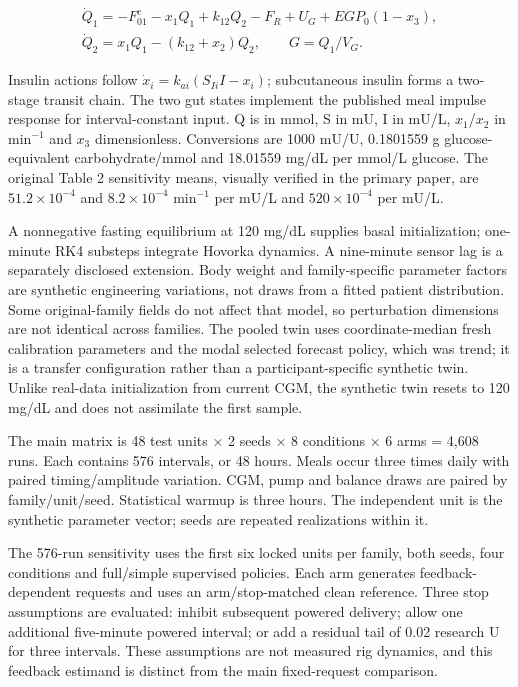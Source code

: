 \documentclass[journal,10pt,letterpaper]{IEEEtran}
\begin{document}
\[\begin{gathered}\dot Q_1=-F_{01}^c-x_1Q_1+k_{12}Q_2-F_R+U_G+EGP_0(1-x_3),\\
\dot Q_2=x_1Q_1-(k_{12}+x_2)Q_2,\qquad G=Q_1/V_G. 
\end{gathered}\tag{6}\]

Insulin actions follow \(\dot x_i=k_{ai}(S_{Ii}I-x_i)\); subcutaneous
insulin forms a two-stage transit chain. The two gut states implement
the published meal impulse response for interval-constant input. Q is in
mmol, S in mU, I in mU/L, \(x_1\)/\(x_2\) in \(\mathrm{min}^{-1}\) and
\(x_3\) dimensionless. Conversions are 1000 mU/U, 0.1801559 g
glucose-equivalent carbohydrate/mmol and 18.01559 mg/dL per mmol/L
glucose. The original Table 2 sensitivity means, visually verified in
the primary paper, are \(51.2\times10^{-4}\) and \(8.2\times10^{-4}\)
\(\mathrm{min}^{-1}\) per mU/L and \(520\times10^{-4}\) per mU/L.

A nonnegative fasting equilibrium at 120 mg/dL supplies basal
initialization; one-minute RK4 substeps integrate Hovorka dynamics. A
nine-minute sensor lag is a separately disclosed extension. Body weight
and family-specific parameter factors are synthetic engineering
variations, not draws from a fitted patient distribution. Some
original-family fields do not affect that model, so perturbation
dimensions are not identical across families. The pooled twin uses
coordinate-median fresh calibration parameters and the modal selected
forecast policy, which was trend; it is a transfer configuration rather
than a participant-specific synthetic twin. Unlike real-data
initialization from current CGM, the synthetic twin resets to 120 mg/dL
and does not assimilate the first sample.

The main matrix is 48 test units × 2 seeds × 8 conditions × 6 arms =
4,608 runs. Each contains 576 intervals, or 48 hours. Meals occur three
times daily with paired timing/amplitude variation. CGM, pump and
balance draws are paired by family/unit/seed. Statistical warmup is
three hours. The independent unit is the synthetic parameter vector;
seeds are repeated realizations within it.

The 576-run sensitivity uses the first six locked units per family, both
seeds, four conditions and full/simple supervised policies. Each arm
generates feedback-dependent requests and uses an arm/stop-matched clean
reference. Three stop assumptions are evaluated: inhibit subsequent
powered delivery; allow one additional five-minute powered interval; or
add a residual tail of 0.02 research U for three intervals. These
assumptions are not measured rig dynamics, and this feedback estimand is
distinct from the main fixed-request comparison.
\end{document}
